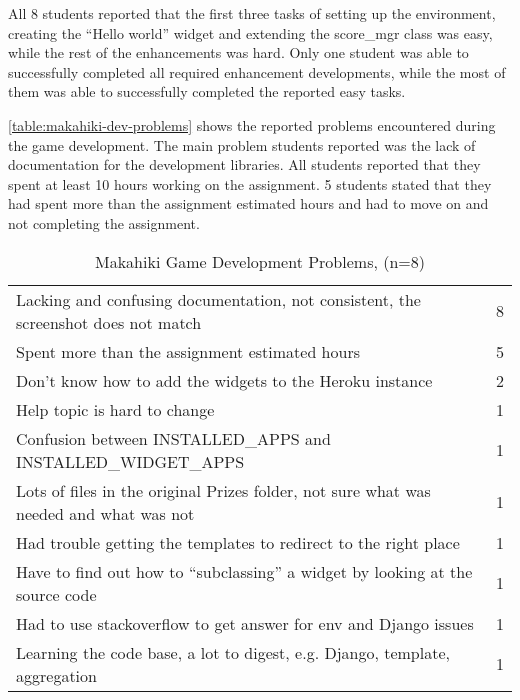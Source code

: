 All 8 students reported that the first three tasks of setting up the environment, creating the  ``Hello world'' widget and extending the score\_mgr class was easy, while the rest of the enhancements was hard. Only one student was able to successfully completed all required enhancement developments, while the most of them was able to  successfully completed the reported easy tasks. 

\autoref{table:makahiki-dev-problems} shows the reported problems encountered during the game development. The main problem students reported was the lack of documentation for the development libraries.  All students reported that they spent at least 10 hours working on the assignment. 5 students stated that they had spent more than the assignment estimated hours and had to move on and not completing the assignment. 

\begin{table}[ht!]
  \centering
  \begin{tabular}{|P{0.8\columnwidth}|P{0.14\columnwidth}|}
    \hline
     &
    \\
    \hline
     Lacking and confusing documentation, not consistent, the screenshot does not match & 8 \\
    \hline
    Spent more than the assignment estimated hours & 5 \\
    \hline
    Don't know how to add the widgets to the Heroku instance & 2  \\
    \hline
    Help topic is hard to change & 1 \\
    \hline
    Confusion between INSTALLED\_APPS and INSTALLED\_WIDGET\_APPS & 1\\ 
     \hline
    Lots of files in the original Prizes folder, not sure what was needed and what was not & 1 \\
     \hline
    Had trouble getting the templates to redirect to the right place & 1\\
    \hline
    Have to find out how to ``subclassing'' a widget by looking at the source code & 1 \\
    \hline
    Had to use stackoverflow to get answer for env and Django issues & 1 \\
    \hline
    Learning the code base, a lot to digest, e.g. Django, template, aggregation & 1 \\
    \hline
  \end{tabular}
  \caption{Makahiki Game Development Problems, (n=8)}
  \label{table:makahiki-dev-problems}
\end{table}

